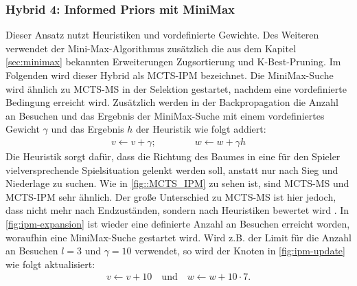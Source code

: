 \documentclass[12pt,a4paper,bibliography=totocnumbered,listof=totocnumbered]{article}
\begin{document}
\subsubsection{Hybrid 4: Informed Priors mit MiniMax}
Dieser Ansatz nutzt Heuristiken und vordefinierte Gewichte. Des Weiteren verwendet der Mini-Max-Algorithmus zusätzlich die aus dem Kapitel \ref{sec:minimax} bekannten Erweiterungen Zugsortierung und K-Best-Pruning. Im Folgenden wird dieser Hybrid als MCTS-IPM bezeichnet. Die MiniMax-Suche wird ähnlich zu MCTS-MS in der Selektion gestartet, nachdem eine vordefinierte Bedingung erreicht wird. Zusätzlich werden in der Backpropagation die Anzahl an Besuchen und das Ergebnis der MiniMax-Suche mit einem vordefiniertes Gewicht $\gamma$ und das Ergebnis $h$ der Heuristik wie folgt addiert:
\begin{align}
	v \leftarrow v + \gamma;\qquad \qquad w \leftarrow w + \gamma h
	\label{eq:ipem}
\end{align}
Die Heuristik sorgt dafür, dass die Richtung des Baumes in eine für den Spieler vielversprechende Spielsituation gelenkt werden soll, anstatt nur nach Sieg und Niederlage zu suchen. Wie in \autoref{fig::MCTS_IPM} zu sehen ist, sind MCTS-MS und MCTS-IPM sehr ähnlich. Der große Unterschied zu MCTS-MS ist hier jedoch, dass nicht mehr nach Endzuständen, sondern nach Heuristiken bewertet wird \citep{Baier.2018}. In \autoref{fig:ipm-expansion} ist wieder eine definierte Anzahl an Besuchen erreicht worden, woraufhin eine MiniMax-Suche gestartet wird.  Wird z.B. der Limit für die Anzahl an Besuchen $l=3$ und $\gamma = 10$ verwendet, so wird der Knoten in \autoref{fig:ipm-update} wie folgt aktualisiert:
\begin{align*}
 v \leftarrow v + 10 \quad \text{und} \quad w \leftarrow w + 10 \cdot 7.
\end{align*}
\end{document}
